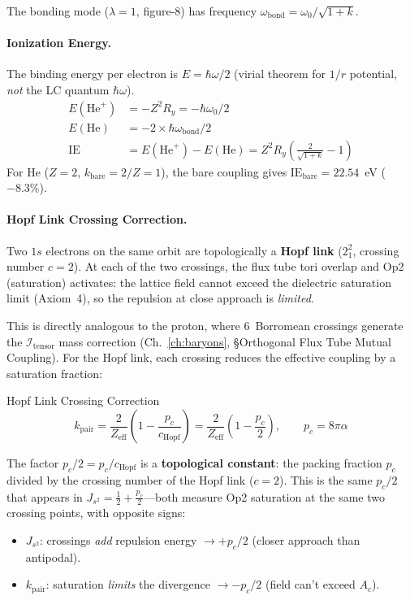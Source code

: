 The bonding mode ($\lambda = 1$, figure-8) has frequency
$\omega_{\text{bond}} = \omega_0/\sqrt{1+k}$.

\paragraph{Ionization Energy.}
The binding energy per electron is $E = \hbar\omega/2$
(virial theorem for $1/r$ potential, \emph{not} the LC quantum $\hbar\omega$).
\begin{align}
    E(\text{He}^+) &= -Z^2 R_y = -\hbar\omega_0/2 \\
    E(\text{He})   &= -2 \times \hbar\omega_{\text{bond}}/2 \\
    \text{IE} &= E(\text{He}^+) - E(\text{He})
              = Z^2 R_y \left(\frac{2}{\sqrt{1+k}} - 1\right)
    \label{eq:ie_coupled}
\end{align}
For He ($Z=2$, $k_{\text{bare}} = 2/Z = 1$), the bare coupling gives
$\text{IE}_{\text{bare}} = 22.54$~eV ($-8.3\%$).

\paragraph{Hopf Link Crossing Correction.}
Two $1s$ electrons on the same orbit are topologically a \textbf{Hopf link}
($2_1^2$, crossing number $c = 2$). At each of the two crossings, the
flux tube tori overlap and Op2 (saturation) activates: the lattice
field cannot exceed the dielectric saturation limit (Axiom~4), so
the repulsion at close approach is \emph{limited}.

This is directly analogous to the proton, where 6~Borromean crossings
generate the $\mathcal{I}_{\text{tensor}}$ mass correction (Ch.~\ref{ch:baryons},
\S Orthogonal Flux Tube Mutual Coupling). For the Hopf link, each crossing
reduces the effective coupling by a saturation fraction:
\begin{resultbox}{Hopf Link Crossing Correction}
\begin{equation}
    k_{\text{pair}} = \frac{2}{Z_{\text{eff}}}\left(1 - \frac{p_c}{c_{\text{Hopf}}}\right)
    = \frac{2}{Z_{\text{eff}}}\left(1 - \frac{p_c}{2}\right), \qquad p_c = 8\pi\alpha
    \label{eq:hopf_k}
\end{equation}
\end{resultbox}
The factor $p_c/2 = p_c/c_{\text{Hopf}}$ is a \textbf{topological constant}:
the packing fraction $p_c$ divided by the crossing number of the Hopf link
($c = 2$). This is the same $p_c/2$ that appears in
$J_{s^2} = \frac{1}{2} + \frac{p_c}{2}$---both measure Op2 saturation
at the same two crossing points, with opposite signs:
\begin{itemize}
    \item $J_{s^2}$: crossings \emph{add} repulsion energy $\to +p_c/2$
          (closer approach than antipodal).
    \item $k_{\text{pair}}$: saturation \emph{limits} the divergence
          $\to -p_c/2$ (field can't exceed $A_c$).
\end{itemize}

